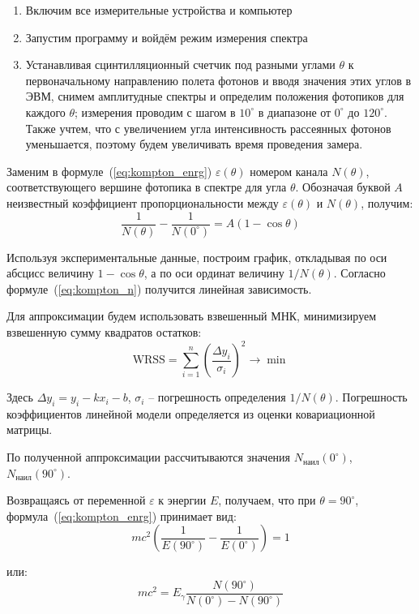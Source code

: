 \documentclass[reprint, nofootinbib, nobalancelastpage, 10pt]{revtex4-2}
\begin{document}
\begin{enumerate}
	\item Включим все измерительные устройства и компьютер
	\item Запустим программу и войдём режим измерения спектра
	\item Устанавливая сцинтилляционный счетчик под разными углами $\theta$ к первоначальному
		направлению полета фотонов и вводя значения этих углов в ЭВМ, снимем амплитудные
		спектры и определим положения фотопиков для каждого $\theta$; измерения проводим с
		шагом в $10^\circ$ в диапазоне от $0^\circ$ до $120^\circ$. Также учтем, что с
		увеличением угла интенсивность рассеянных фотонов уменьшается, поэтому будем
		увеличивать время проведения замера.
\end{enumerate}

Заменим в формуле~(\ref{eq:kompton_enrg}) $\varepsilon(\theta)$ номером канала $N(\theta)$,
соответствующего вершине фотопика в спектре для угла $\theta$. Обозначая буквой $A$
неизвестный коэффициент пропорциональности между $\varepsilon(\theta)$ и $N(\theta)$,
получим:
\begin{equation}
	\label{eq:kompton_n}
	\dfrac{1}{N(\theta)} - \dfrac{1}{N(0^\circ)} = A (1 - \cos \theta)
\end{equation}

Используя экспериментальные данные, построим график, откладывая по оси абсцисс величину
$1 - \cos \theta$, а по оси ординат величину $1/N(\theta)$. Согласно
формуле~(\ref{eq:kompton_n}) получится линейная зависимость.

Для аппроксимации будем использовать взвешенный МНК, минимизируем взвешенную сумму
квадратов остатков:
\[\text{WRSS} = \sum_{i=1}^n \left( \dfrac{\Delta y_i}{\sigma_i} \right)^2 \longrightarrow \min\]

Здесь $\Delta y_i = y_i - kx_i - b$, $\sigma_i$ -- погрешность определения $1/N(\theta)$.
Погрешность коэффициентов линейной модели определяется из оценки ковариационной матрицы. 

По полученной аппроксимации рассчитываются значения $N_{\text{наил}}(0^\circ)$,
$N_\text{наил}(90^\circ)$.

Возвращаясь от переменной $\varepsilon$ к энергии $E$, получаем, что при $\theta=90^\circ$,
формула~(\ref{eq:kompton_enrg}) принимает вид:
\[mc^2 \left( \dfrac{1}{E(90^\circ)} - \dfrac{1}{E(0^\circ)} \right) = 1\]

или:
\begin{equation}
	\label{eq:res}
	mc^2 = E_{\gamma} \dfrac{N(90^\circ)}{N(0^\circ) - N(90^\circ)}
\end{equation}
	
\end{document}
